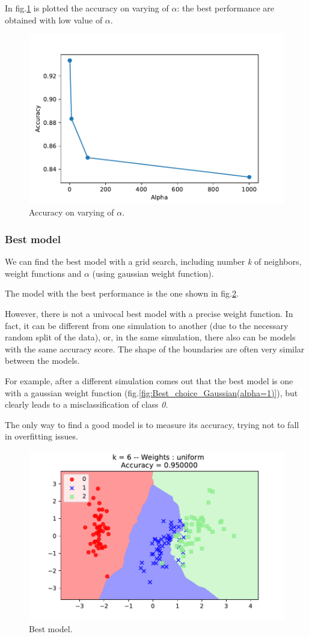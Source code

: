 \documentclass[10pt,a4paper]{article}
\begin{document}
		In fig.\ref{fig:Accuracy_gaussian} is plotted the accuracy on varying of $\alpha$: the best performance are obtained with low value of $\alpha$.
		
		\begin{figure}[!h]
		\centering
		\includegraphics[width=0.7\linewidth]{../Images/Accuracy_gaussian}
		\caption{Accuracy on varying of $\alpha$.}
		\label{fig:Accuracy_gaussian}
		\end{figure}
		
		\newpage
		\subsubsection*{Best model}
		
		We can find the best model with a grid search, including number \emph{k} of neighbors, weight functions and $\alpha$ (using gaussian weight function).
		
		The model with the best performance is the one shown in fig.\ref{fig:Best_choice}.
		
		However, there is not a univocal best model with a precise weight function. In fact, it can be different from one simulation to another (due to the necessary random split of the data), or, in the same simulation, there also can be models with the same accuracy score. The shape of the boundaries are often very similar between the models. 
		
		For example, after a different simulation comes out that the best model is one with a gaussian weight function (fig.\ref{fig:Best_choice_Gaussian(alpha=1)}), but clearly leads to a misclassification of class \emph{0}.
		
		The only way to find a good model is to measure its accuracy, trying not to fall in overfitting issues.
		
		\begin{figure}[!ht]
		\centering
		\includegraphics[width=0.7\linewidth]{../Images/Best_choice_uniform}
		\caption{Best model.}
		\label{fig:Best_choice}
		\end{figure}
		
\end{document}
